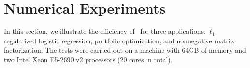 \section{Numerical Experiments}
In this section, we illustrate the efficiency of \pkg~for three applications: $\ell_1$ regularized logistic regression, portfolio optimization,  and nonnegative matrix factorization. The tests were carried out on a machine with 64GB of memory and two Intel Xeon E5-2690 v2 processors (20 cores in total).




